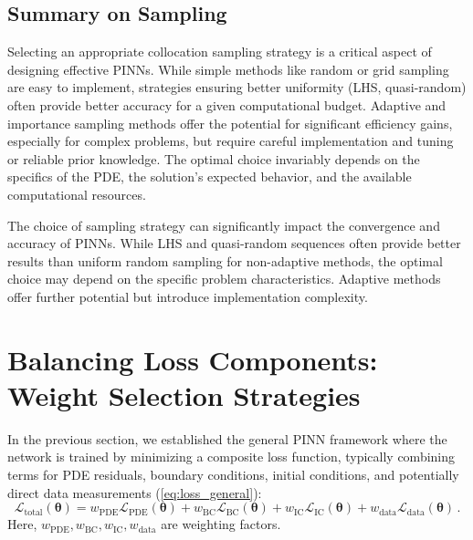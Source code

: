 \subsection{Summary on Sampling}

Selecting an appropriate collocation sampling strategy is a critical aspect of designing effective PINNs. While simple methods like random or grid sampling are easy to implement, strategies ensuring better uniformity (LHS, quasi-random) often provide better accuracy for a given computational budget. Adaptive and importance sampling methods offer the potential for significant efficiency gains, especially for complex problems, but require careful implementation and tuning or reliable prior knowledge. The optimal choice invariably depends on the specifics of the PDE, the solution's expected behavior, and the available computational resources.

\begin{remark}
The choice of sampling strategy can significantly impact the convergence and accuracy of PINNs. While LHS and quasi-random sequences often provide better results than uniform random sampling for non-adaptive methods, the optimal choice may depend on the specific problem characteristics. Adaptive methods offer further potential but introduce implementation complexity.
\end{remark}


\section{Balancing Loss Components: Weight Selection Strategies}
\label{sec:weight-selection}

In the previous section, we established the general PINN framework where the network is trained by minimizing a composite loss function, typically combining terms for PDE residuals, boundary conditions, initial conditions, and potentially direct data measurements (\cref{eq:loss_general}):
\begin{equation*}
\mathcal{L}_{\text{total}}(\boldsymbol{\theta}) = 
w_{\text{PDE}}\mathcal{L}_{\text{PDE}}(\boldsymbol{\theta}) + 
w_{\text{BC}}\mathcal{L}_{\text{BC}}(\boldsymbol{\theta}) + 
w_{\text{IC}}\mathcal{L}_{\text{IC}}(\boldsymbol{\theta}) + 
w_{\text{data}}\mathcal{L}_{\text{data}}(\boldsymbol{\theta}) \,. 
\end{equation*} 
%
Here, $w_{\text{PDE}}, w_{\text{BC}}, w_{\text{IC}}, w_{\text{data}}$ are weighting factors.

